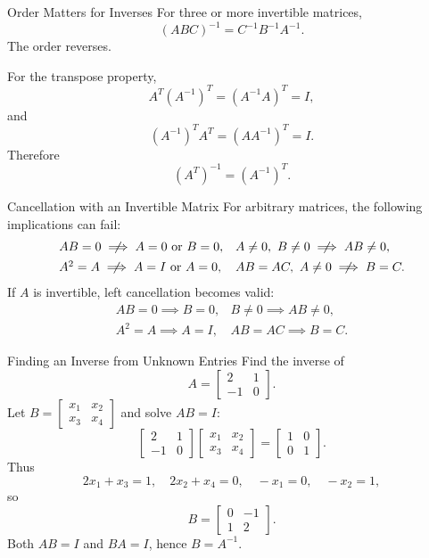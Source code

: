 \begin{frame}{Order Matters for Inverses}
For three or more invertible matrices,
\[
(ABC)^{-1}=C^{-1}B^{-1}A^{-1}.
\]
The order reverses.
\medskip

For the transpose property,
\[
A^T(A^{-1})^T=(A^{-1}A)^T=I,
\]
and
\[
(A^{-1})^TA^T=(AA^{-1})^T=I.
\]
Therefore
\[
(A^T)^{-1}=(A^{-1})^T.
\]
\end{frame}

\begin{frame}{Cancellation with an Invertible Matrix}
For arbitrary matrices, the following implications can fail:
\[
\begin{array}{ll}
AB=0\centernot\implies A=0\text{ or }B=0,
&
A\ne0,\ B\ne0\centernot\implies AB\ne0,\\[1ex]
A^2=A\centernot\implies A=I\text{ or }A=0,
&
AB=AC,\ A\ne0\centernot\implies B=C.
\end{array}
\]
If $A$ is invertible, left cancellation becomes valid:
\[
\begin{array}{ll}
AB=0\implies B=0,
&
B\ne0\implies AB\ne0,\\[1ex]
A^2=A\implies A=I,
&
AB=AC\implies B=C.
\end{array}
\]
\end{frame}

\begin{frame}[shrink=7]{Finding an Inverse from Unknown Entries}
Find the inverse of
\[
A=\begin{bmatrix}2&1\\-1&0\end{bmatrix}.
\]
Let $B=\begin{bmatrix}x_1&x_2\\x_3&x_4\end{bmatrix}$ and solve $AB=I$:
\[
\begin{bmatrix}2&1\\-1&0\end{bmatrix}
\begin{bmatrix}x_1&x_2\\x_3&x_4\end{bmatrix}
=\begin{bmatrix}1&0\\0&1\end{bmatrix}.
\]
Thus
\[
2x_1+x_3=1,\quad 2x_2+x_4=0,\quad -x_1=0,\quad -x_2=1,
\]
so
\[
B=\begin{bmatrix}0&-1\\1&2\end{bmatrix}.
\]
Both $AB=I$ and $BA=I$, hence $B=A^{-1}$.
\end{frame}

